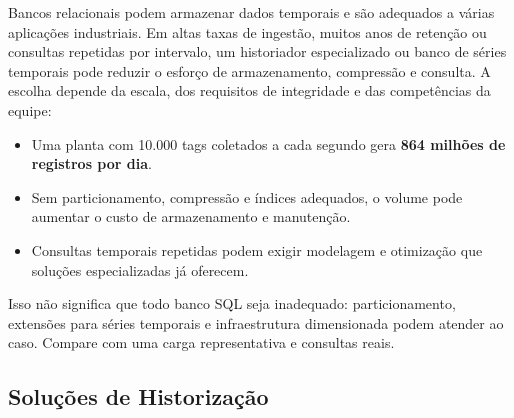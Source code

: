 Bancos relacionais podem armazenar dados temporais e são adequados a várias aplicações industriais.
Em altas taxas de ingestão, muitos anos de retenção ou consultas repetidas por intervalo, um
historiador especializado ou banco de séries temporais pode reduzir o esforço de armazenamento,
compressão e consulta. A escolha depende da escala, dos requisitos de integridade e das competências
da equipe:

\begin{itemize}
\tightlist
\item
  Uma planta com 10.000 tags coletados a cada segundo gera \textbf{864 milhões de registros por dia}.
\item
  Sem particionamento, compressão e índices adequados, o volume pode aumentar o custo de armazenamento e manutenção.
\item
  Consultas temporais repetidas podem exigir modelagem e otimização que soluções especializadas já oferecem.
\end{itemize}

Isso não significa que todo banco SQL seja inadequado: particionamento, extensões para séries
temporais e infraestrutura dimensionada podem atender ao caso. Compare com uma carga representativa
e consultas reais.

\subsection{Soluções de Historização}\label{soluuxe7uxf5es-de-historizauxe7uxe3o}

